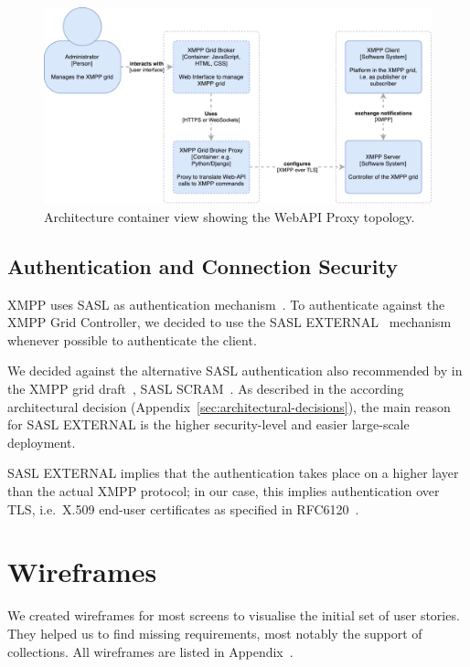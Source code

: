\begin{figure}[h]
\centering
\includegraphics[width=0.7\linewidth]{resources/architecture_container_proxy.pdf}
\caption[Architecture Container Diagram Web Proxy]{Architecture container view showing the WebAPI Proxy topology.}
\label{fig:architecturecontainerwebproxy}
\end{figure}


\subsection{Authentication and Connection Security}

XMPP uses SASL as authentication mechanism~\cite{rfc6120}.
To authenticate against the XMPP Grid Controller, we decided to use the SASL EXTERNAL~\cite{rfc4422} mechanism whenever possible to authenticate the client.

We decided against the alternative SASL authentication also recommended by in the XMPP grid draft~\cite{ietf-mile-xmpp-grid-05}, SASL SCRAM~\cite{rfc7677}.
As described in the according architectural decision (Appendix~\ref{sec:architectural-decisions}), the main reason for SASL EXTERNAL is the higher security-level and easier large-scale deployment.

SASL EXTERNAL implies that the authentication takes place on a higher layer than the actual XMPP protocol; in our case, this implies authentication over TLS, i.e.~X.509 end-user certificates as specified in RFC6120~\cite{rfc6120}.


\section{Wireframes}

We created wireframes for most screens to visualise the initial set of user stories.
They helped us to find missing requirements, most notably the support of collections.
All wireframes are listed in Appendix~.
